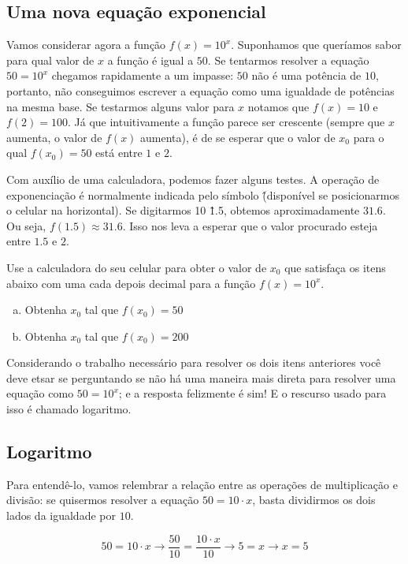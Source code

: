 \documentclass[main_estudante.tex]{subfiles}
\begin{document}
\subsection*{Uma nova equação exponencial}

Vamos considerar agora a função $f(x)=10^x$. Suponhamos que queríamos sabor para qual valor de $x$ a função é igual a $50$. Se tentarmos resolver a equação $50=10^x$ chegamos rapidamente a um impasse: $50$ não é uma potência de $10$, portanto, não conseguimos escrever a equação como uma igualdade de potências na mesma base. Se testarmos alguns valor para $x$ notamos que $f(x)=10$ e $f(2)=100$. Já que intuitivamente a função parece ser crescente (sempre que $x$ aumenta, o valor de $f(x)$ aumenta), é de se esperar que o valor de $x_0$ para o qual $f(x_0)=50$ está entre $1$ e $2$.

Com auxílio de uma calculadora, podemos fazer alguns testes. A operação de exponenciação é normalmente indicada pelo símbolo \^ (disponível se posicionarmos o celular na horizontal). Se digitarmos 10 \^ 1.5, obtemos aproximadamente $31.6$. Ou seja, $f(1.5) \approx 31.6$. Isso nos leva a esperar que o valor procurado esteja entre $1.5$ e $2$.

\begin{questao}
Use a calculadora do seu celular para obter o valor de $x_0$ que satisfaça os itens abaixo com uma cada depois decimal para a função $f(x)=10^x$.
\begin{enumerate}[a)]
\item Obtenha $x_0$ tal que $f(x_0)=50$
\item Obtenha $x_0$ tal que $f(x_0)=200$
\end{enumerate}
\end{questao}

Considerando o trabalho necessário para resolver os dois itens anteriores você deve etsar se perguntando se não há uma maneira mais direta para resolver uma equação como $50=10^x$; e a resposta felizmente é sim! E o rescurso usado para isso é chamado logaritmo.

\subsection*{Logaritmo}

Para entendê-lo, vamos relembrar a relação entre as operações de multiplicação e divisão: se quisermos resolver a equação $50=10 \cdot x$, basta dividirmos os dois lados da igualdade por $10$.

$$
50=10 \cdot x \longrightarrow \frac{50}{10}=\frac{10 \cdot x}{10} \longrightarrow 5=x \longrightarrow x=5
$$
\end{document}
